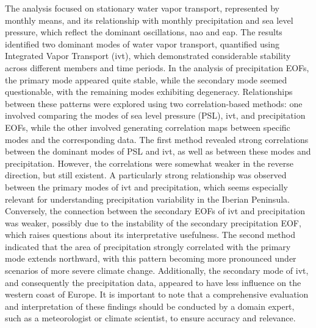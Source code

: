 The analysis focused on stationary water vapor transport, represented by monthly means, and its relationship with monthly precipitation and sea level pressure, which reflect the dominant oscillations, \ac{nao} and \ac{eap}. 
The results identified two dominant modes of water vapor transport, quantified using Integrated Vapor Transport (\ac{ivt}), which demonstrated considerable stability across different members and time periods.
In the analysis of precipitation EOFs, the primary mode appeared quite stable, while the secondary mode seemed questionable, with the remaining modes exhibiting degeneracy. 
Relationships between these patterns were explored using two correlation-based methods: one involved comparing the modes of sea level pressure (PSL), \ac{ivt}, and precipitation EOFs, while the other involved generating correlation maps between specific modes and the corresponding data.
The first method revealed strong correlations between the dominant modes of PSL and \ac{ivt}, as well as between these modes and precipitation. 
However, the correlations were somewhat weaker in the reverse direction, but still existent. 
A particularly strong relationship was observed between the primary modes of \ac{ivt} and precipitation, which seems especially relevant for understanding precipitation variability in the Iberian Peninsula. 
Conversely, the connection between the secondary EOFs of \ac{ivt} and precipitation was weaker, possibly due to the instability of the secondary precipitation EOF, which raises questions about its interpretative usefulness.
The second method indicated that the area of precipitation strongly correlated with the primary mode extends northward, with this pattern becoming more pronounced under scenarios of more severe climate change. 
Additionally, the secondary mode of \ac{ivt}, and consequently the precipitation data, appeared to have less influence on the western coast of Europe.
It is important to note that a comprehensive evaluation and interpretation of these findings should be conducted by a domain expert, such as a meteorologist or climate scientist, to ensure accuracy and relevance.

